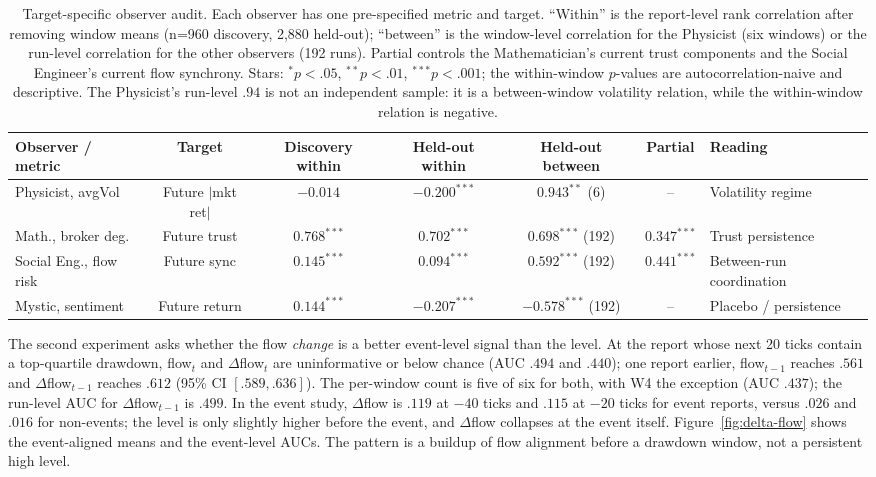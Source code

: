 \documentclass[11pt]{article}
\begin{document}
\begin{table}[t]
  \centering
  \footnotesize
  \setlength{\tabcolsep}{2.5pt}
  \caption{Target-specific observer audit. Each observer has one pre-specified
  metric and target. ``Within'' is the report-level rank correlation after
  removing window means (n=960 discovery, 2,880 held-out); ``between'' is the
  window-level correlation for the Physicist (six windows) or the run-level
  correlation for the other observers (192 runs). Partial controls the
  Mathematician's current trust components and the Social Engineer's current flow
  synchrony. Stars: $^{*}p<.05$, $^{**}p<.01$, $^{***}p<.001$; the within-window
  $p$-values are autocorrelation-naive and descriptive. The Physicist's
  run-level $.94$ is not an independent sample: it is a between-window
  volatility relation, while the within-window relation is negative.}
  \label{tab:observer-targets}
  \begin{tabular}{lcccccl}
    \toprule
    Observer / metric & Target & Discovery within & Held-out within & Held-out between & Partial & Reading\\
    \midrule
    Physicist, avgVol & Future $|$mkt ret$|$ & $-0.014$ & $-0.200^{***}$ & $0.943^{**}$ (6) & -- & Volatility regime\\
    Math., broker deg. & Future trust & $0.768^{***}$ & $0.702^{***}$ & $0.698^{***}$ (192) & $0.347^{***}$ & Trust persistence\\
    Social Eng., flow risk & Future sync & $0.145^{***}$ & $0.094^{***}$ & $0.592^{***}$ (192) & $0.441^{***}$ & Between-run coordination\\
    Mystic, sentiment & Future return & $0.144^{***}$ & $-0.207^{***}$ & $-0.578^{***}$ (192) & -- & Placebo / persistence\\
    \bottomrule
  \end{tabular}
\end{table}

The second experiment asks whether the flow \emph{change} is a better event-level
signal than the level. At the report whose next 20 ticks contain a top-quartile
drawdown, flow$_t$ and $\Delta$flow$_t$ are uninformative or below chance
(AUC $.494$ and $.440$); one report earlier, flow$_{t-1}$ reaches $.561$ and
$\Delta$flow$_{t-1}$ reaches $.612$ (95\% CI $[.589,.636]$). The per-window count
is five of six for both, with W4 the exception (AUC $.437$); the run-level AUC for
$\Delta$flow$_{t-1}$ is $.499$. In the event study, $\Delta$flow is $.119$ at
$-40$ ticks and $.115$ at $-20$ ticks for event reports, versus $.026$ and $.016$
for non-events; the level is only slightly higher before the event, and
$\Delta$flow collapses at the event itself. Figure~\ref{fig:delta-flow} shows the
event-aligned means and the event-level AUCs. The pattern is a buildup of flow
alignment before a drawdown window, not a persistent high level.
\end{document}
